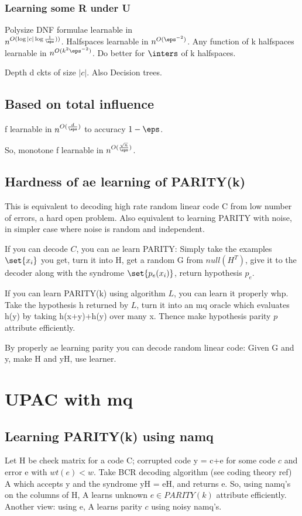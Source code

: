 \documentclass[oneside, article]{memoir}
\begin{document}
\subsubsection{Learning some R under U}
Polysize DNF formulae learnable in \\
$n^{O(\log |c|\log\frac{1}{\eps}))}$. Halfspaces learnable in $n^{O(\eps^{-2})}$. Any function of k halfspaces learnable in $n^{O(k^{2}\eps^{-2})}$. \oprob Do better for $\inters$ of k halfspaces.

Depth d ckts of size $|c|$. Also Decision trees. \why

\subsection{Based on total influence}
f learnable in $n^{O(\frac{d}{\eps})}$ to accuracy $1-\eps$. \why

So, monotone f learnable in $n^{O(\frac{\sqrt{n}}{\eps})}$.



\subsection{Hardness of ae learning of PARITY(k)}
This is equivalent to decoding high rate random linear code C from low number of errors, a hard open problem. Also equivalent to learning PARITY with noise, in simpler case where noise is random and independent.

If you can decode $C$, you can ae learn PARITY: Simply take the examples $\set{x_i}$ you get, turn it into H, get a random G from $null(H^{T})$, give it to the decoder along with the syndrome $\set{p_{e}(x_i)}$, return hypothesis $p_{e}$.

If you can learn PARITY(k) using algorithm $L$, you can learn it properly whp. Take the hypothesis h returned by $L$, turn it into an mq oracle which evaluates h(y) by taking h(x+y)+h(y) over many x. Thence make hypothesis parity $p$ attribute efficiently.

By properly ae learning parity you can decode random linear code: Given G and y, make H and yH, use learner.


\section{UPAC with mq}
\subsection{Learning PARITY(k) using namq}
Let H be check matrix for a code C; corrupted code y = c+e for some code $c$ and error e with $wt(e) < w$. Take BCR decoding algorithm (see coding theory ref) A which accepts y and the syndrome yH = eH, and returns e. So, using namq's on the columns of H, A learns unknown $e \in PARITY(k)$ attribute efficiently. Another view: using e, A learns parity $c$ using noisy namq's.
\end{document}

